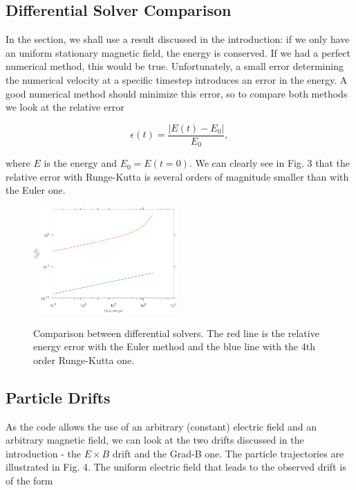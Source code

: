 \subsection{Differential Solver Comparison}

In the section, we shall use a result discussed in the introduction: if we only have an uniform stationary magnetic field, the energy is conserved. If we had a perfect numerical method, this would be true. Unfortunately, a small error determining the numerical velocity at a specific timestep introduces an error in the energy. A good numerical method should minimize this error, so to compare both methods we look at the relative error

\begin{equation}
\epsilon(t)=\frac{|E(t)-E_0|}{E_0},
\end{equation}

\noindent where $E$ is the energy and $E_0 = E(t=0)$. We can clearly see in Fig. 3 that the relative error with Runge-Kutta is several orders of magnitude smaller than with the Euler one.

\begin{figure}[h!]
  \centering
    \includegraphics[width=0.49\textwidth]{../Results/energy_error_both.pdf}
    \label{err}
      \caption{Comparison between differential solvers. The red line is the relative energy error with the Euler method and the blue line with the 4th order Runge-Kutta one.}
\end{figure}

\subsection{Particle Drifts}

As the code allows the use of an arbitrary (constant) electric field and an arbitrary magnetic field, we can look at the two drifts discussed in the introduction - the $E \times B$ drift and the Grad-B one. The particle trajectories are illustrated in Fig. 4. The uniform electric field that leads to the observed drift is of the form

